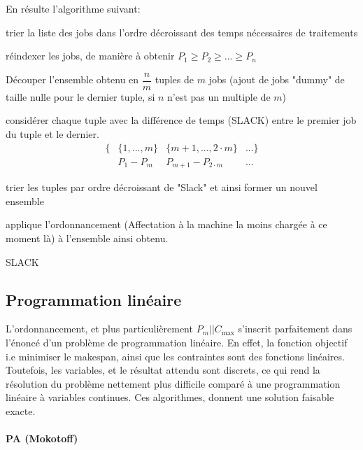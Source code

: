 \documentclass[a4paper,12pt]{report}
\theoremstyle{plain}				%
\theoremstyle{definition}				%
\newcommand\PmCmax{$P_m||C_{\max}$\xspace}
\begin{document}
En résulte l'algorithme suivant:

\bigskip
\begin{algorithm}[H]
\DontPrintSemicolon

trier la liste des jobs dans l'ordre décroissant des temps nécessaires de traitements

\BlankLine %
réindexer les jobs, de manière à obtenir $P_1 \geq P_2 \geq ... \geq P_n$

\BlankLine %
Découper l'ensemble obtenu en $\dfrac{n}{m}$ tuples de $m$ jobs (ajout
de jobs "dummy" de taille nulle pour le dernier tuple, si $n$ n'est
pas un multiple de $m$)

\BlankLine %
considérer chaque tuple avec la différence de temps (SLACK) entre le
premier job du tuple et le dernier.
\begin{align*}
\{ &\{1, ..., m\} &\{m+1,..., 2 \cdot m\} &... \} \\
   &P_1 - P_m     &P_{m+1}-P_{2 \cdot m}  &...
\end{align*}


\BlankLine %
trier les tuples par ordre décroissant de "Slack" et ainsi former un nouvel ensemble

\BlankLine %
applique l'ordonnancement (Affectation à la machine la moins chargée à ce moment là) à l'ensemble ainsi obtenu.

\caption{SLACK\label{SLACK}}
\end{algorithm}

\subsection{Programmation linéaire}

L'ordonnancement, et plus particulièrement \PmCmax s'inscrit
parfaitement dans l'énoncé d'un problème de programmation linéaire.
En effet, la fonction objectif i.e minimiser le makespan, ainsi que
les contraintes sont des fonctions linéaires.
Toutefois, les variables, et le résultat attendu sont discrets, ce qui
rend la résolution du problème nettement plus difficile comparé à une
programmation linéaire à variables continues.
Ces algorithmes, donnent une solution faisable exacte.

\paragraph{PA (Mokotoff)}
\end{document}
